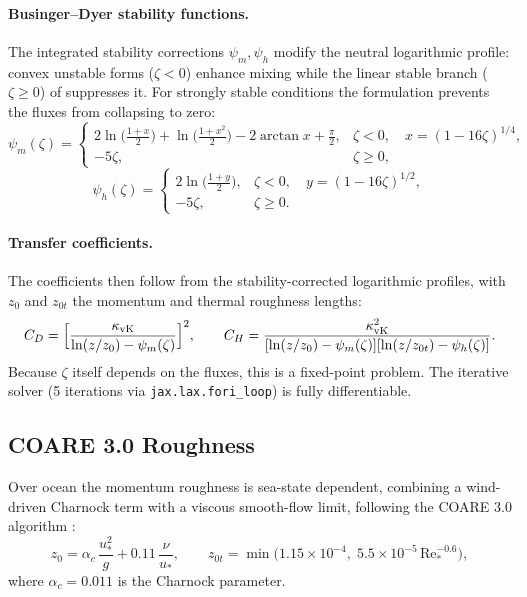 \documentclass[11pt,twoside]{report}
\begin{document}
\paragraph{Businger--Dyer stability functions.}
The integrated stability corrections $\psi_m,\psi_h$ modify the neutral
logarithmic profile: convex unstable forms ($\zeta<0$) enhance mixing while
the linear stable branch ($\zeta\ge0$) of \citet{Businger1971} suppresses it.
For strongly stable conditions the \citet{Beljaars1995} formulation prevents
the fluxes from collapsing to zero:
\begin{equation}
  \psi_m(\zeta) = \begin{cases}
    2\ln\!\bigl(\frac{1+x}{2}\bigr)+\ln\!\bigl(\frac{1+x^2}{2}\bigr)
    -2\arctan x+\frac{\pi}{2}, & \zeta<0,\quad x=(1-16\zeta)^{1/4}, \\[4pt]
    -5\zeta, & \zeta\ge 0,
  \end{cases}
\end{equation}
\begin{equation}
  \psi_h(\zeta) = \begin{cases}
    2\ln\!\bigl(\frac{1+y}{2}\bigr), & \zeta<0,\quad y=(1-16\zeta)^{1/2}, \\[4pt]
    -5\zeta, & \zeta\ge 0.
  \end{cases}
\end{equation}

\paragraph{Transfer coefficients.}
The coefficients then follow from the stability-corrected logarithmic
profiles, with $z_0$ and $z_{0t}$ the momentum and thermal roughness lengths:
\begin{equation}
  C_D = \Bigl[\frac{\kappa_{\mathrm{vK}}}
  {\ln(z/z_0)-\psi_m(\zeta)}\Bigr]^2, \qquad
  C_H = \frac{\kappa_{\mathrm{vK}}^2}
  {[\ln(z/z_0)-\psi_m(\zeta)][\ln(z/z_{0t})-\psi_h(\zeta)]}.
\end{equation}
Because $\zeta$ itself depends on the fluxes, this is a fixed-point problem.
The iterative solver (5 iterations via \texttt{jax.lax.fori\_loop}) is
fully differentiable.

\subsection{COARE 3.0 Roughness}

Over ocean the momentum roughness is sea-state dependent, combining a
wind-driven Charnock term with a viscous smooth-flow limit, following the
COARE 3.0 algorithm \citep{Fairall2003}:
\begin{equation}
  z_0 = \alpha_c\,\frac{u_*^2}{g}+0.11\,\frac{\nu}{u_*},
  \qquad
  z_{0t} = \min\!\bigl(1.15\times10^{-4},\;
  5.5\times10^{-5}\,\mathrm{Re}_*^{-0.6}\bigr),
\end{equation}
where $\alpha_c=0.011$ is the Charnock parameter.
\end{document}
